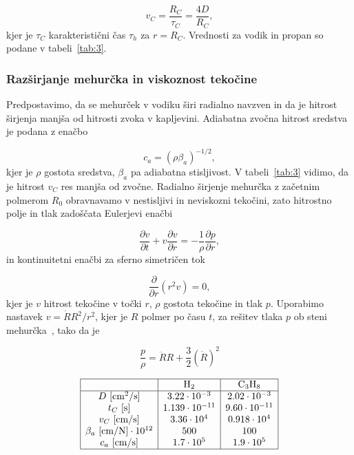 \[  v_C = \frac{R_C}{\tau_C} = \frac{4 D}{R_C},
\]
kjer je \( \tau_C \) karakteristični čas \( \tau_h \) za \( r = R_C \). Vrednosti za vodik in propan so podane v tabeli~\ref{tab:3}.

\subsubsection*{Razširjanje mehurčka in viskoznost tekočine}

Predpostavimo, da se mehurček v vodiku širi radialno navzven in da je hitrost širjenja manjša od hitrosti zvoka v kapljevini. Adiabatna zvočna hitrost sredstva je podana z enačbo

\[  c_a = {\left( \rho \beta_a \right)}^{-1/2},
\]
kjer je \( \rho \) gostota sredstva, \( \beta_a \) pa adiabatna stisljivost. V tabeli~\ref{tab:3} vidimo, da je hitrost \( v_C \) res manjša od zvočne.
Radialno širjenje mehurčka z začetnim polmerom \( R_0 \) obravnavamo v nestisljivi in neviskozni tekočini, zato hitrostno polje in tlak zadoščata Eulerjevi enačbi 

\[  \frac{\partial v}{\partial t} + v \frac{\partial v}{\partial r} = - \frac{1}{\rho} \frac{\partial p}{\partial r},
\]
in kontinuitetni enačbi za sferno simetričen tok

\[ \frac{\partial }{\partial r} \left( r ^2 v \right) = 0, 
\]
kjer je \( v \) hitrost tekočine v točki \( r \), \( \rho \) gostota tekočine in tlak \( p \). Uporabimo nastavek \( v = \dot{R} R ^2 / r ^2 \), kjer je \( R \) polmer po času \( t \), za rešitev tlaka \( p \) ob steni mehurčka~\cite{landau_fluid_1987}, tako da je

\begin{equation}
\label{eq3:4}
\frac{p}{\rho} = \ddot{R} R + \frac{3}{2} {\left( \dot{R}  \right)}^2
\end{equation}

\begin{table}
  \label{tab:3}
  \centering
  \[
    \begin{array}{|c|c|c|} \hline
      & \mathrm{H}_2 & \mathrm{C}_3 \mathrm{H}_8 \\ \hline
      D \ [ \mathrm{cm ^2}/ \mathrm{s}] & 3.22 \cdot 10^{-3} & 2.02 \cdot 10^{-3} \\
      t_C \  [\mathrm{s}] & 1.139 \cdot 10^{-11} & 9.60 \cdot 10^{-11} \\
      v_C \  [ \mathrm{cm} / \mathrm{s}] & 3.36 \cdot 10^4 & 0.918 \cdot 10^4\\
      \beta_a \  [ \mathrm{cm}/ \mathrm{N}] \cdot 10^{12} & 500 & 100 \\
      c_a \ [ \mathrm{cm}/ \mathrm{s}] & 1.7 \cdot 10^5 & 1.9 \cdot 10^5 \\ \hline
    \end{array}
  \]
\end{table}

